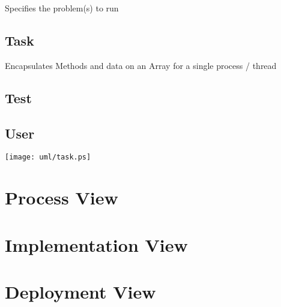 \documentclass{book}
\begin{document}
Specifies the problem(s) to run

\section{Task}

Encapsulates Methods and data on an Array for a single process /
thread

\section{Test}

\section{User}

\centerline{\texttt{[image: uml/task.ps]}}

\chapter{Process View}

\chapter{Implementation View}

\chapter{Deployment View}
\end{document}
